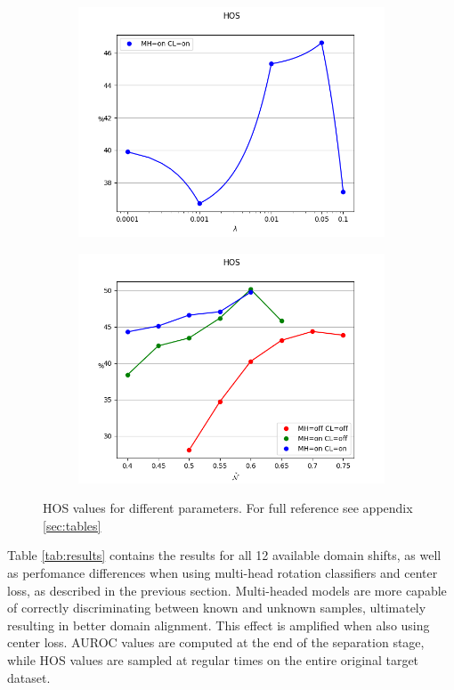 \documentclass[10pt,twocolumn,letterpaper]{article}
\begin{document}
\begin{figure}[!htb]
\begin{subfigure}[!htb]{0.35\textwidth}
    \includegraphics[trim=0 0 0 2cm, clip, width=\linewidth]{hos-l.png}
  \end{subfigure}
  \begin{subfigure}[!htb]{0.35\textwidth}
    \includegraphics[trim=0 0 0 2cm, clip, width=\linewidth]{hos-th.png}
  \end{subfigure}
  \caption{\centering\label{figurelabel} HOS values for different parameters. For full reference see appendix \ref{sec:tables}}
\end{figure}

Table \ref{tab:results} contains the results for all 12 available domain shifts,
as well as perfomance differences when using multi-head rotation classifiers and center loss,
as described in the previous section.
Multi-headed models are more capable of correctly discriminating between known and unknown samples,
ultimately resulting in better domain alignment.
This effect is amplified when also using center loss.
AUROC values are computed at the end of the separation stage, 
while HOS values are sampled at regular times on the entire original target dataset.
\end{document}
